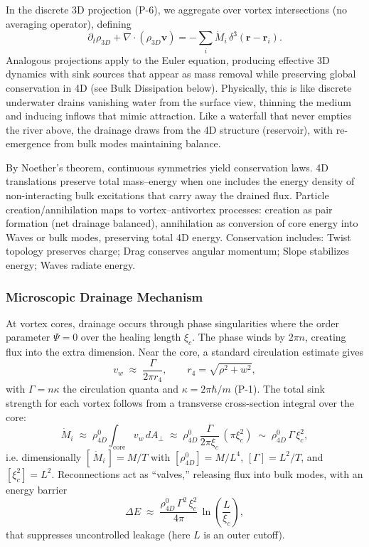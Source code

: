 In the discrete 3D projection (P-6), we aggregate over vortex intersections (no averaging operator), defining
\begin{equation}
\partial_t \rho_{3D} + \nabla \!\cdot (\rho_{3D}\mathbf{v}) = -\sum_i \dot{M}_i\,\delta^3(\mathbf{r}-\mathbf{r}_i).
\end{equation}
Analogous projections apply to the Euler equation, producing effective 3D dynamics with sink sources that appear as mass removal while preserving global conservation in 4D (see Bulk Dissipation below). Physically, this is like discrete underwater drains vanishing water from the surface view, thinning the medium and inducing inflows that mimic attraction. Like a waterfall that never empties the river above, the drainage draws from the 4D structure (reservoir), with re-emergence from bulk modes maintaining balance.

By Noether's theorem, continuous symmetries yield conservation laws. 4D translations preserve total mass–energy when one includes the energy density of non-interacting bulk excitations that carry away the drained flux. Particle creation/annihilation maps to vortex–antivortex processes: creation as pair formation (net drainage balanced), annihilation as conversion of core energy into Waves or bulk modes, preserving total 4D energy. Conservation includes: Twist topology preserves charge; Drag conserves angular momentum; Slope stabilizes energy; Waves radiate energy.

\subsubsection{Microscopic Drainage Mechanism}
At vortex cores, drainage occurs through phase singularities where the order parameter $\Psi=0$ over the healing length $\xi_c$. The phase winds by $2\pi n$, creating flux into the extra dimension. Near the core, a standard circulation estimate gives
\begin{equation}
v_w \;\approx\; \frac{\Gamma}{2\pi r_4},\qquad r_4=\sqrt{\rho^2+w^2},
\end{equation}
with $\Gamma=n\kappa$ the circulation quanta and $\kappa=2\pi\hbar/m$ (P-1). The total sink strength for each vortex follows from a transverse cross-section integral over the core:
\begin{equation}
\dot M_i \;\approx\; \rho_{4D}^0 \int_{\text{core}} v_w\, dA_\perp 
\;\approx\; \rho_{4D}^0\,\frac{\Gamma}{2\pi \xi_c}\,(\pi \xi_c^2)
\;\sim\; \rho_{4D}^0\,\Gamma\,\xi_c^2,
\end{equation}
i.e. dimensionally $[\,\dot M_i\,]=M/T$ with $[\rho_{4D}^0]=M/L^4$, $[\Gamma]=L^2/T$, and $[\xi_c^2]=L^2$. Reconnections act as ``valves,'' releasing flux into bulk modes, with an energy barrier
\begin{equation}
\Delta E \;\approx\; \frac{\rho_{4D}^0\,\Gamma^2\,\xi_c^2}{4\pi}\,\ln\!\left(\frac{L}{\xi_c}\right),
\end{equation}
that suppresses uncontrolled leakage (here $L$ is an outer cutoff).

